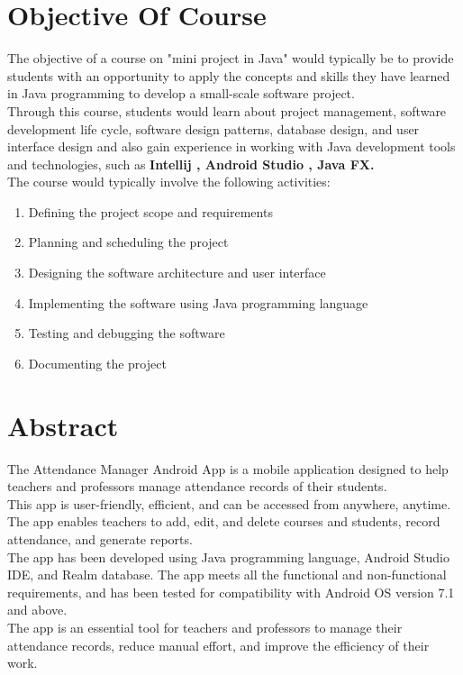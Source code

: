 \documentclass{article}
\begin{document}
\section {Objective Of Course}
{\fontsize{14}{14}\selectfont The objective of a course on "mini project in Java" would typically be to provide students with an opportunity to apply the concepts and skills they have learned in Java programming to develop a small-scale software project.\\
Through this course, students would learn about project management, software development life cycle, software design patterns, database design, and user interface design and also gain experience in working with Java development tools and technologies, such as \textbf{Intellij , Android Studio , Java FX.}
\\
The course would typically involve the following activities:
\begin{enumerate}
   \item Defining the project scope and requirements
  \item Planning and scheduling the project
  \item Designing the software architecture and user interface
  \item Implementing the software using Java programming language
  \item Testing and debugging the software
  \item Documenting the project
\end{enumerate}
}
\newpage
\doublespacing
\section{Abstract}
{\fontsize{14}{14}\selectfont The Attendance Manager Android App is a mobile application designed to help teachers and professors manage attendance records of their students. \\
This app is user-friendly, efficient, and can be accessed from anywhere, anytime. The app enables teachers to add, edit, and delete courses and students, record attendance, and generate reports. \\
The app has been developed using Java programming language, Android Studio IDE, and Realm database. The app meets all the functional and non-functional requirements, and has been tested for compatibility with Android OS version 7.1 and above. \\
The app is an essential tool for teachers and professors to manage their attendance records, reduce manual effort, and improve the efficiency of their work.}
\end{document}
